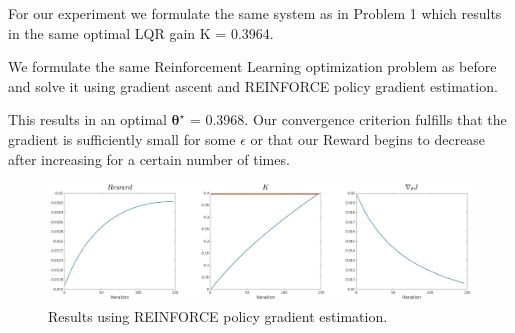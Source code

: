 \documentclass[11pt]{homework}
\renewcommand{\vec}[1]{\ensuremath{\boldsymbol{#1}}}
\begin{document}
\begin{arabicparts}
	\questionpart
	
	For our experiment we formulate the same system as in Problem 1 which results in the same optimal LQR gain K = 0.3964.
	
	We formulate the same Reinforcement Learning optimization problem as before and solve it using gradient ascent and REINFORCE policy gradient estimation. 
	
	This results in an optimal $\vec{\theta}^{\star}$ = 0.3968. Our convergence criterion fulfills that the gradient is sufficiently small for some $\epsilon$ or that our Reward begins to decrease after increasing for a certain number of times.
	
	\begin{figure}[H]
		\centering
		\includegraphics[scale=0.19]{reinforce_results.jpg}
		\caption{Results using REINFORCE policy gradient estimation.}
		\label{}
	\end{figure}
	
\end{arabicparts}

	
\end{document}
